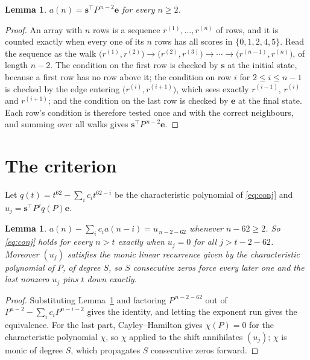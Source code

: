 \documentclass[11pt,a4paper]{article}
\theoremstyle{plain}
\newtheorem{lemma}[theorem]{Lemma}
\theoremstyle{definition}
\begin{document}
\begin{lemma}\label{lem:walk}
$a(n)=\mathbf{s}^{\!\top}P^{\,n-2}\mathbf{e}$ for every $n\ge2$.
\end{lemma}

\begin{proof}
An array with $n$ rows is a sequence $r^{(1)},\dots,r^{(n)}$ of rows, and it is counted
exactly when every one of its $n$ rows has all scores in $\{0,1,2,4,5\}$. Read the sequence as the
walk $\bigl(r^{(1)},r^{(2)}\bigr)\to\bigl(r^{(2)},r^{(3)}\bigr)\to\cdots\to
\bigl(r^{(n-1)},r^{(n)}\bigr)$, of length $n-2$. The condition on the first row is
checked by $\mathbf{s}$ at the initial state, because a first row has no row above it; the
condition on row $i$ for $2\le i\le n-1$ is checked by the edge entering
$\bigl(r^{(i)},r^{(i+1)}\bigr)$, which sees exactly $r^{(i-1)}$, $r^{(i)}$ and
$r^{(i+1)}$; and the condition on the last row is checked by $\mathbf{e}$ at the final
state. Each row's condition is therefore tested once and with the correct neighbours, and
summing over all walks gives $\mathbf{s}^{\!\top}P^{\,n-2}\mathbf{e}$.
\end{proof}

\section{The criterion}

Let $q(t)=t^{62}-\sum_i c_i t^{62-i}$ be the characteristic polynomial of
\eqref{eq:conj} and $u_j=\mathbf{s}^{\!\top}P^{j}q(P)\mathbf{e}$.

\begin{lemma}\label{lem:crit}
$a(n)-\sum_i c_i a(n-i)=u_{\,n-2-62}$ whenever $n-62\ge2$. So \eqref{eq:conj}
holds for every $n>t$ exactly when $u_j=0$ for all $j>t-2-62$. Moreover $(u_j)$
satisfies the monic linear recurrence given by the characteristic polynomial of $P$, of
degree $S$, so $S$ consecutive zeros force every later one and the last nonzero $u_j$ pins
$t$ down exactly.
\end{lemma}

\begin{proof}
Substituting Lemma~\ref{lem:walk} and factoring $P^{\,n-2-62}$ out of
$P^{n-2}-\sum_i c_i P^{n-i-2}$ gives the identity, and letting the exponent run gives the
equivalence. For the last part, Cayley--Hamilton gives $\chi(P)=0$ for the characteristic
polynomial $\chi$, so $\chi$ applied to the shift annihilates $(u_j)$; $\chi$ is monic of
degree $S$, which propagates $S$ consecutive zeros forward.
\end{proof}
\end{document}
